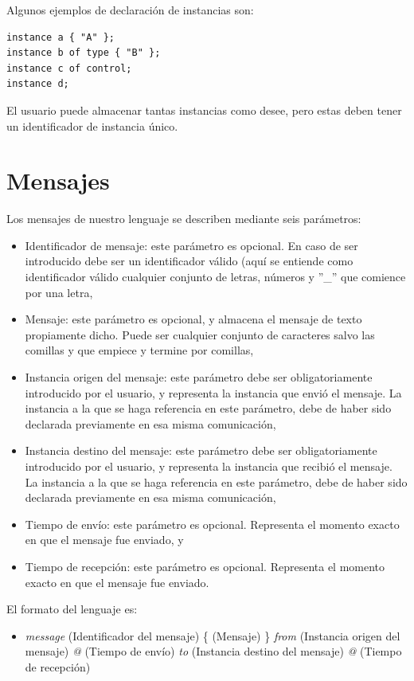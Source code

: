 \documentclass[12pt,a4paper]{report}
\begin{document}
Algunos ejemplos de declaración de instancias son:

\begin{lstlisting}
instance a { "A" };
instance b of type { "B" };
instance c of control;
instance d;
\end{lstlisting}

El usuario puede almacenar tantas instancias como desee, pero estas deben tener un identificador de instancia único.

\section{Mensajes}

Los mensajes de nuestro lenguaje se describen mediante seis parámetros:

\begin{itemize}
\item Identificador de mensaje: este parámetro es opcional. En caso de ser introducido debe ser un identificador válido (aquí se entiende como identificador válido cualquier conjunto de letras, números y ''\_'' que comience por una letra,
\item Mensaje: este parámetro es opcional, y almacena el mensaje de texto propiamente dicho. Puede ser cualquier conjunto de caracteres salvo las comillas y que empiece y termine por comillas,
\item Instancia origen del mensaje: este parámetro debe ser obligatoriamente introducido por el usuario, y representa la instancia que envió el mensaje. La instancia a la que se haga referencia en este parámetro, debe de haber sido declarada previamente en esa misma comunicación,
\item Instancia destino del mensaje: este parámetro debe ser obligatoriamente introducido por el usuario, y representa la instancia que recibió el mensaje. La instancia a la que se haga referencia en este parámetro, debe de haber sido declarada previamente en esa misma comunicación,
\item Tiempo de envío: este parámetro es opcional. Representa el momento exacto en que el mensaje fue enviado, y
\item Tiempo de recepción: este parámetro es opcional. Representa el momento exacto en que el mensaje fue enviado.
\end{itemize}

El formato del lenguaje es:

\begin{itemize}
\item \textit{message} (Identificador del mensaje) \{ (Mensaje) \} \textit{from} (Instancia origen del mensaje) \textit{@} (Tiempo de envío) \textit{to} (Instancia destino del mensaje) \textit{@} (Tiempo de recepción)
\end{itemize}
\end{document}
